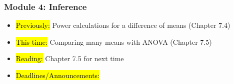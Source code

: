 
\begin{frame}
    \frametitle{Module 4: Inference}
    \begin{itemize}
        \item \hl{Previously: }Power calculations for a difference of means (Chapter 7.4)
        \item \hl{This time: }Comparing many means with ANOVA (Chapter 7.5)
        \item \hl{Reading: }Chapter 7.5 for next time
        \item \hl{Deadlines/Announcements: }
    \end{itemize}
    
\end{frame}